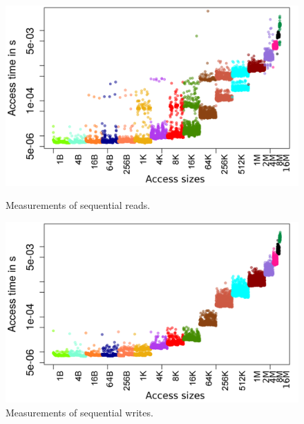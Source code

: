 \documentclass{superfri}
\begin{document}
\begin{figure}[b]
	\centering
	\begin{minipage}[b]{0.47\textwidth}
		\includegraphics[width=\textwidth]{src/plot_SizeSorted_log_read_seq2.png}
		\caption{Measurements of sequential reads.}
		\label{read_seq}
	\end{minipage}
	\hfill
	\begin{minipage}[b]{0.47\textwidth}
		\includegraphics[width=\textwidth]{src/plot_SizeSorted_log_write_seq.png}
		\caption{Measurements of sequential writes.}
		\label{write_seq}
	\end{minipage}
\end{figure}
\end{document}
